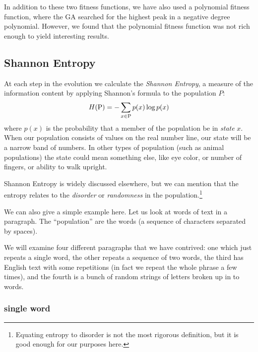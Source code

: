 \documentclass[11pt]{article}
\begin{document}
In addition to these two fitness functions, we have also used a
polynomial fitness function, where the GA searched for the highest
peak in a negative degree polynomial. However, we found that the
polynomial fitness function was not rich enough to yield interesting
results.



\subsection{Shannon Entropy}

At each step in the evolution we calculate the \emph{Shannon Entropy},
a measure of the information content by applying Shannon's formula to
the population $P$:
\begin{equation}
H({\rm P}) = -\sum_{x \in {\rm P}} p(x)\log p(x)
\label{eq:shannon-entropy-def}
\end{equation}
where $p(x)$ is the probability that a member of the population be in
\emph{state} $x$.  When our population consists of values on the real
number line, our state will be a narrow band of numbers.  In other
types of population (such as animal populations) the state could mean
something else, like eye color, or number of fingers, or ability to
walk upright.

Shannon Entropy is widely discussed elsewhere, but we can mention that
the entropy relates to the \emph{disorder} or \emph{randomness} in the
population.\footnote{Equating entropy to disorder is not the most
rigorous definition, but it is good enough for our purposes here.}

We can also give a simple example here.  Let us look at words of text
in a paragraph.  The ``population'' are the words (a sequence of
characters separated by spaces).

We will examine four different paragraphs that we have contrived: one
which just repeats a single word, the other repeats a sequence of two
words, the third has English text with some repetitions (in fact we
repeat the whole phrase a few times), and the fourth is a bunch of
random strings of letters broken up in to words.



\subsubsection{single word}
\end{document}
